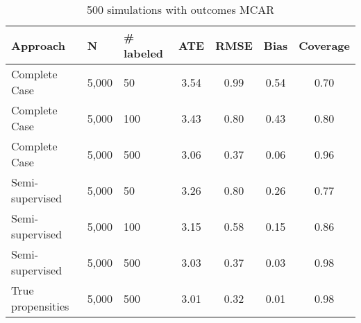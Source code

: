 \begin{table}[ht]
\centering
\begingroup\small
\begin{tabular}{lllcc>{\columncolor[gray]{.9}}c>{\columncolor[gray]{.9}}c}
  \hline
Approach & N & \# labeled & ATE & RMSE & Bias & Coverage \\ 
  \hline
  Complete Case & 5,000 &  50 & 3.54 & 0.99 & 0.54 & 0.70 \\ 
  Complete Case & 5,000 & 100 & 3.43 & 0.80 & 0.43 & 0.80 \\ 
  Complete Case & 5,000 & 500 & 3.06 & 0.37 & 0.06 & 0.96 \\ 
  \rowcolor[gray]{.8} Semi-supervised & 5,000 &  50 & 3.26 & 0.80 & 0.26 & 0.77 \\ 
  \rowcolor[gray]{.7} Semi-supervised & 5,000 & 100 & 3.15 & 0.58 & 0.15 & 0.86 \\ 
  \rowcolor[gray]{.6} Semi-supervised & 5,000 & 500 & 3.03 & 0.37 & 0.03 & 0.98 \\ 
  \rowcolor[gray]{.5} True propensities & 5,000 & 500 & 3.01 & 0.32 & 0.01 & 0.98 \\ 
  \hline
\end{tabular}
\endgroup
\caption{500 simulations with outcomes MCAR} 
\end{table}
